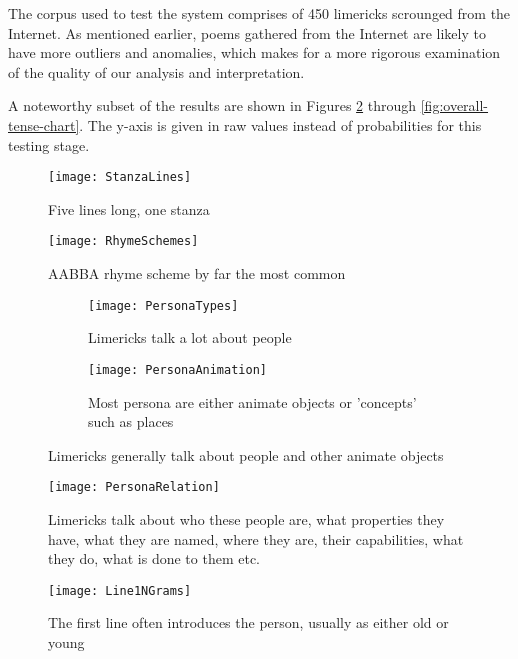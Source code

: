 The corpus used to test the system comprises of 450 limericks scrounged from the Internet. As mentioned earlier, poems gathered from the Internet are likely to have more outliers and anomalies, which makes for a more rigorous examination of the quality of our analysis and interpretation. 

A noteworthy subset of the results are shown in Figures \ref{fig:rhyme-scheme-chart} through \ref{fig:overall-tense-chart}. The y-axis is given in raw values instead of probabilities for this testing stage.
\newcommand{\exedout}{%
  \rule{0.8\textwidth}{0.5\textwidth}%
}

\begin{figure}[t!]
\centering
\texttt{[image: StanzaLines]}
\caption{Five lines long, one stanza}
\label{fig:stanza-lines-chart}
\end{figure}

\begin{figure}[t!]
\centering
\texttt{[image: RhymeSchemes]}
\caption{AABBA rhyme scheme by far the most common}
\label{fig:rhyme-scheme-chart}
\end{figure}

\begin{figure*}[t!]
    \centering
    \begin{subfigure}[t]{0.9\textwidth}
        \centering
        \texttt{[image: PersonaTypes]}
        \caption{Limericks talk a lot about people}
    \end{subfigure}%
    
    \begin{subfigure}[t]{0.9\textwidth}
        \centering
        \texttt{[image: PersonaAnimation]}
        \caption{Most persona are either animate objects or 'concepts' such as places}
    \end{subfigure}
    \caption{Limericks generally talk about people and other animate objects}
    \label{fig:persona-chart}
\end{figure*}

\begin{figure}[t!]
\centering
\texttt{[image: PersonaRelation]}
\caption{Limericks talk about who these people are, what properties they have, what they are named, where they are, their capabilities, what they do, what is done to them etc.}
\label{fig:persona-relation-chart}
\end{figure}

\begin{figure}[t!]
\centering
\texttt{[image: Line1NGrams]}
\caption{The first line often introduces the person, usually as either old or young}
\label{fig:n-grams-1-chart}
\end{figure}

